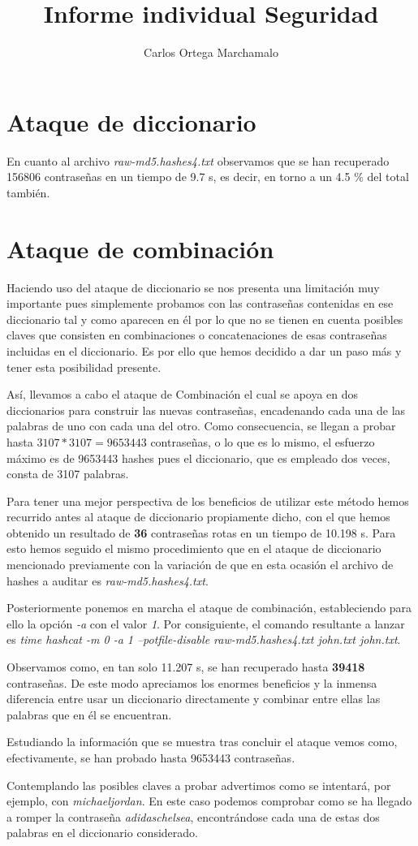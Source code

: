\documentclass{article}
\title{Informe individual Seguridad}
\author{Carlos Ortega Marchamalo}
\date{}
\begin{document}
	\maketitle

		\section{Ataque de diccionario}
			En cuanto al archivo \textit{raw-md5.hashes4.txt} observamos que se han recuperado 156806 contraseñas en un tiempo de 9.7 s, es decir, en torno a un 4.5 \% del total también.

		\section{Ataque de combinación}
			Haciendo uso del ataque de diccionario se nos presenta una limitación muy importante pues simplemente probamos con las contraseñas contenidas en ese diccionario tal y como aparecen en él por lo que no se tienen en cuenta posibles claves que consisten en combinaciones o concatenaciones de esas contraseñas incluidas en el diccionario. Es por ello que hemos decidido a dar un paso más y tener esta posibilidad presente.

			Así, llevamos a cabo el ataque de Combinación el cual se apoya en dos diccionarios para construir las nuevas contraseñas, encadenando cada una de las palabras de uno con cada una del otro. Como consecuencia, se llegan a probar hasta $3107 * 3107 = 9653443$ contraseñas, o lo que es lo mismo, el esfuerzo máximo es de 9653443 hashes pues el diccionario, que es empleado dos veces, consta de 3107 palabras.

			Para tener una mejor perspectiva de los beneficios de utilizar este método hemos recurrido antes al ataque de diccionario propiamente dicho, con el que hemos obtenido un resultado de \textbf{36} contraseñas rotas en un tiempo de 10.198 s. Para esto hemos seguido el mismo procedimiento que en el ataque de diccionario mencionado previamente con la variación de que en esta ocasión el archivo de hashes a auditar es \textit{raw-md5.hashes4.txt}.

			Posteriormente ponemos en marcha el ataque de combinación, estableciendo para ello la opción \textit{-a} con el valor \textit{1}. Por consiguiente, el comando resultante a lanzar es \textit{time hashcat -m 0 -a 1 --potfile-disable raw-md5.hashes4.txt john.txt john.txt}.

			Observamos como, en tan solo 11.207 s, se han recuperado hasta \textbf{39418} contraseñas. De este modo apreciamos los enormes beneficios y la inmensa diferencia entre usar un diccionario directamente y combinar entre ellas las palabras que en él se encuentran.

			Estudiando la información que se muestra tras concluir el ataque vemos como, efectivamente, se han probado hasta 9653443 contraseñas.

			Contemplando las posibles claves a probar advertimos como se intentará, por ejemplo, con \textit{michaeljordan}. En este caso podemos comprobar como se ha llegado a romper la contraseña \textit{adidaschelsea}, encontrándose cada una de estas dos palabras en el diccionario considerado.
\end{document}
